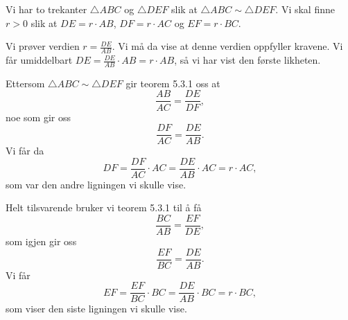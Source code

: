 \begin{oppgave}[5.3.1]
    Vi har to trekanter $\triangle ABC$ og $\triangle DEF$ slik at $\triangle ABC \sim \triangle DEF$. 
    Vi skal finne $r>0$ slik at $DE=r\cdot AB$, $DF=r\cdot AC$ og $EF=r\cdot BC$. 

    \begin{figure}[H]
        \centering
         
    \end{figure}

    Vi prøver verdien $r=\frac{DE}{AB}$. 
    Vi må da vise at denne verdien oppfyller kravene. 
    Vi får umiddelbart $DE= \frac{DE}{AB}\cdot AB = r\cdot AB$, så vi har vist den første likheten. 
    
    Ettersom $\triangle ABC\sim\triangle DEF$ gir teorem 5.3.1 oss at 
    $$\frac{AB}{AC}=\frac{DE}{DF},$$
    noe som gir oss 
    $$\frac{DF}{AC}=\frac{DE}{AB}.$$
    Vi får da
    $$DF = \frac{DF}{AC}\cdot AC=\frac{DE}{AB}\cdot AC = r\cdot AC,$$
    som var den andre ligningen vi skulle vise. 
    
    Helt tilsvarende bruker vi teorem 5.3.1 til å få 
    $$\frac{BC}{AB}=\frac{EF}{DE},$$
    som igjen gir oss 
    $$\frac{EF}{BC}=\frac{DE}{AB}.$$
    Vi får 
    $$EF=\frac{EF}{BC}\cdot BC = \frac{DE}{AB}\cdot BC = r\cdot BC,$$
    som viser den siste ligningen vi skulle vise. 
\end{oppgave}

